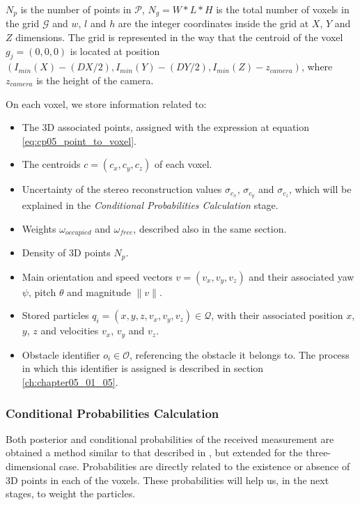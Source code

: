 $N_p$ is the number of points in $\mathcal{P}$, $N_g = W * L * H$ is the total number of voxels in the grid $\mathcal{G}$ and $w$, $l$ and $h$ are the integer coordinates inside the grid at $X$, $Y$ and $Z$ dimensions. The grid is represented in the way that the centroid of the voxel $g_j=(0,0,0)$ is located at position $(I_{min}(X) - (DX/2), I_{min}(Y) - (DY/2), I_{min}(Z) - z_{camera})$, where $z_{camera}$ is the height of the camera.

On each voxel, we store information related to:
\begin{itemize}
 \item The 3D associated points, assigned with the expression at equation \ref{eq:cp05_point_to_voxel}.
 \item The centroids $c=(c_x, c_y, c_z)$ of each voxel.
 \item Uncertainty of the stereo reconstruction values $\sigma_{c_x}$, $\sigma_{c_y}$ and $\sigma_{c_z}$, which will be explained in the \emph{Conditional Probabilities Calculation} stage.
 \item Weights $\omega_{occupied}$ and $\omega_{free}$, described also in the same section.
 \item Density of 3D points $N_p$.
 \item Main orientation and speed vectors $v=(v_x, v_y, v_z)$ and their associated yaw $\psi$, pitch $\theta$ and magnitude $\|v\|$.
 \item Stored particles $q_i = (x, y, z, v_x, v_y, v_z) \in \mathcal{Q}$, with their associated position $x$, $y$, $z$ and velocities $v_x$, $v_y$ and $v_z$.
 \item Obstacle identifier $o_i \in \mathcal{O}$, referencing the obstacle it belongs to. The process in which this identifier is assigned is described in section \ref{ch:chapter05_01_05}.
\end{itemize}

\subsubsection{Conditional Probabilities Calculation}\label{ch:chapter05_01_03_01}

Both posterior and conditional probabilities of the received measurement are obtained a method similar to that described in \cite{isard1998condensation}, but extended for the three-dimensional case. Probabilities are directly related to the existence or absence of 3D points in each of the voxels. These probabilities will help us, in the next stages, to weight the particles.

